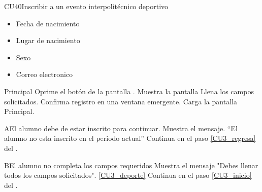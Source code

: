 \begin{UseCase}{CU40}{Inscribir a un evento interpolitécnico deportivo}
{\begin{itemize}
			\item Fecha de nacimiento
			\item Lugar de nacimiento
			\item Sexo
			\item Correo electronico
	\end{itemize}}
\end{UseCase}
\begin{UCtrayectoria}{Principal}
	\UCpaso[\UCactor] Oprime el botón  de la pantalla .\label{CU3_inicio}
	\UCpaso Muestra la pantalla \label{CU3_regresa}
	\UCpaso[\UCactor] Llena los campos solicitados. 
	\UCpaso Confirma registro en una ventana emergente.
	\UCpaso Carga la pantalla Principal.
\end{UCtrayectoria}

\begin{UCtrayectoriaA}{A}{El alumno debe de estar inscrito para continuar.}
	\UCpaso Muestra el mensaje. “El alumno no esta inscrito en el periodo actual”
	\UCpaso Continua en el paso \ref{CU3_regresa} del .
\end{UCtrayectoriaA}

\begin{UCtrayectoriaA}{B}{El alumno no completa los campos requeridos}
	\UCpaso Muestra el mensaje "Debes llenar todos los campos solicitados". \ref{CU3_deporte}
	\UCpaso Continua en el paso \ref{CU3_inicio} del .
\end{UCtrayectoriaA}